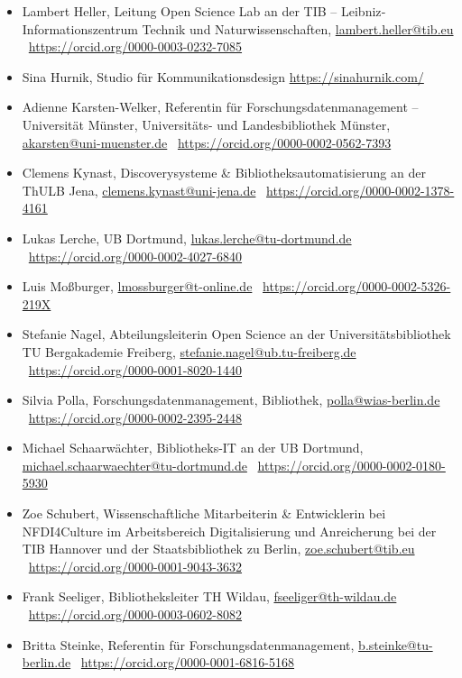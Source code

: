 \documentclass[
  11pt,
  letterpaper,
  DIV=11,
  twoside]{scrreprt}
\begin{document}
\begin{itemize}
  Berlin, \url{dorian.grosch@sbb.spk-berlin.de}
  \orcidlogo~\url{https://orcid.org/0009-0002-1975-1114}
\item
  Lambert Heller, Leitung Open Science Lab an der TIB --
  Leibniz‐Informationszentrum Technik und Naturwissenschaften,
  \url{lambert.heller@tib.eu}
  \orcidlogo~\url{https://orcid.org/0000-0003-0232-7085}
\item
  Sina Hurnik, Studio für Kommunikationsdesign
  \url{https://sinahurnik.com/}
\item
  Adienne Karsten-Welker, Referentin für Forschungsdatenmanagement --
  Universität Münster, Universitäts- und Landesbibliothek Münster,
  \url{akarsten@uni-muenster.de}
  \orcidlogo~\url{https://orcid.org/0000-0002-0562-7393}
\item
  Clemens Kynast, Discoverysysteme \& Bibliotheksautomatisierung an der
  ThULB Jena, \url{clemens.kynast@uni-jena.de}
  \orcidlogo~\url{https://orcid.org/0000-0002-1378-4161}
\item
  Lukas Lerche, UB Dortmund, \url{lukas.lerche@tu-dortmund.de}
  \orcidlogo~\url{https://orcid.org/0000-0002-4027-6840}
\item
  Luis Moßburger, \url{lmossburger@t-online.de}
  \orcidlogo~\url{https://orcid.org/0000-0002-5326-219X}
\item
  Stefanie Nagel, Abteilungsleiterin Open Science an der
  Universitätsbibliothek TU Bergakademie Freiberg,
  \url{stefanie.nagel@ub.tu-freiberg.de}
  \orcidlogo~\url{https://orcid.org/0000-0001-8020-1440}
\item
  Silvia Polla, Forschungsdatenmanagement, Bibliothek,
  \url{polla@wias-berlin.de}
  \orcidlogo~\url{https://orcid.org/0000-0002-2395-2448}
\item
  Michael Schaarwächter, Bibliotheks-IT an der UB Dortmund,
  \url{michael.schaarwaechter@tu-dortmund.de}
  \orcidlogo~\url{https://orcid.org/0000-0002-0180-5930}
\item
  Zoe Schubert, Wissenschaftliche Mitarbeiterin \& Entwicklerin bei
  NFDI4Culture im Arbeitsbereich Digitalisierung und Anreicherung bei
  der TIB Hannover und der Staatsbibliothek zu Berlin,
  \url{zoe.schubert@tib.eu}
  \orcidlogo~\url{https://orcid.org/0000-0001-9043-3632}
\item
  Frank Seeliger, Bibliotheksleiter TH Wildau,
  \url{fseeliger@th-wildau.de}
  \orcidlogo~\url{https://orcid.org/0000-0003-0602-8082}
\item
  Britta Steinke, Referentin für Forschungsdatenmanagement,
  \url{b.steinke@tu-berlin.de}
  \orcidlogo~\url{https://orcid.org/0000-0001-6816-5168}

\end{itemize}
\end{document}
